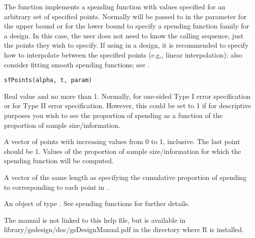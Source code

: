 \begin{Description}\relax
The function  implements a spending function with values specified for an arbitrary set of specified points.
Normally  will be passed to  in the parameter  for the upper bound or
 for the lower bound to specify a spending function family for a design.
In this case, the user does not need to know the calling sequence, just the points they wish to specify.
If using  in a design, it is recommended to specify how to interpolate between the specified points (e.g,, linear interpolation); also consider fitting smooth spending functions; see 
.
\end{Description}
\begin{Usage}
\begin{verbatim}
sfPoints(alpha, t, param)
\end{verbatim}
\end{Usage}
\begin{Arguments}
\begin{ldescription}
\item[\code{alpha}] Real value  and no more than 1. Normally,  for one-sided Type I error specification
or  for Type II error specification. However, this could be set to 1 if for descriptive purposes
you wish to see the proportion of spending as a function of the proportion of sample size/information.
\item[\code{t}] A vector of points with increasing values from 0 to 1, inclusive. The last point should be 1.
Values of the proportion of sample size/information for which the spending function will be computed.
\item[\code{param}] A vector of the same length as  specifying the cumulative proportion of spending
to corresponding to each point in .
\end{ldescription}
\end{Arguments}
\begin{Value}
An object of type . See spending functions for further details.
\end{Value}
\begin{Note}\relax
The manual is not linked to this help file, but is available in library/gsdesign/doc/gsDesignManual.pdf
in the directory where R is installed.
\end{Note}
